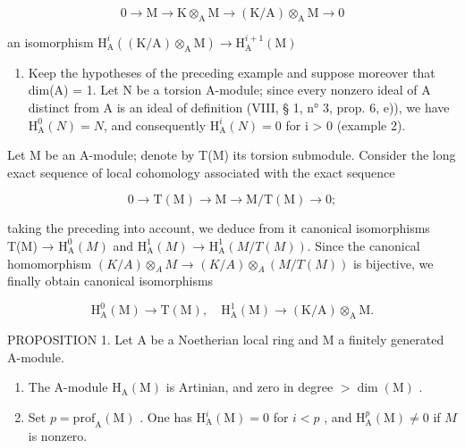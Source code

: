 \[
0 \rightarrow \mathrm{M} \rightarrow \mathrm{K} \otimes_ {\mathrm{A}} \mathrm{M} \rightarrow (\mathrm{K/A}) \otimes_ {\mathrm{A}} \mathrm{M} \rightarrow 0
\]

an isomorphism \(\mathrm{H}_{\mathrm{A}}^{i}((\mathrm{K}/\mathrm{A})\otimes_{\mathrm{A}}\mathrm{M})\to \mathrm{H}_{\mathrm{A}}^{i + 1}(\mathrm{M})\)

\begin{enumerate}
\def\labelenumi{\arabic{enumi})}
\setcounter{enumi}{4}
\tightlist
\item
  Keep the hypotheses of the preceding example and suppose moreover that dim(A) = 1. Let N be a torsion A-module; since every nonzero ideal of A distinct from A is an ideal of definition (VIII, § 1, n° 3, prop. 6, e)), we have \(\mathrm{H}_{\mathrm{A}}^{0}(N) = N\), and consequently \(\mathrm{H}_{\mathrm{A}}^{i}(N) = 0\) for i > 0 (example 2).
\end{enumerate}

Let M be an A-module; denote by T(M) its torsion submodule. Consider the long exact sequence of local cohomology associated with the exact sequence

\[
0 \to \mathrm{T} (\mathrm{M}) \to \mathrm{M} \to \mathrm{M} / \mathrm{T} (\mathrm{M}) \to 0;
\]

taking the preceding into account, we deduce from it canonical isomorphisms T(M) → \(\mathrm{H}_{\mathrm{A}}^{0}(M)\) and \(\mathrm{H}_{\mathrm{A}}^{1}(M)\) → \(\mathrm{H}_{\mathrm{A}}^{1}(M/T(M))\). Since the canonical homomorphism \((K/A) \otimes_{A} M\) → \((K/A) \otimes_{A} (M/T(M))\) is bijective, we finally obtain canonical isomorphisms

\[
\mathrm{H} _ {\mathrm{A}} ^ {0} (\mathrm{M}) \rightarrow \mathrm{T} (\mathrm{M}), \quad \mathrm{H} _ {\mathrm{A}} ^ {1} (\mathrm{M}) \rightarrow (\mathrm{K} / \mathrm{A}) \otimes_ {\mathrm{A}} \mathrm{M}.
\]

PROPOSITION 1. Let A be a Noetherian local ring and M a finitely generated A-module.

\begin{enumerate}
\def\labelenumi{\alph{enumi})}
\item
  The A-module \(\mathrm{H}_{\mathrm{A}}(\mathrm{M})\) is Artinian, and zero in degree \(>\dim (\mathrm{M})\) .
\item
  Set \(p = \mathrm{prof}_{\mathrm{A}}(\mathrm{M})\) . One has \(\mathrm{H}_{\mathrm{A}}^{i}(\mathrm{M}) = 0\) for \(i < p\) , and \(\mathrm{H}_{\mathrm{A}}^{p}(\mathrm{M}) \neq 0\) if \(M\) is nonzero.
\end{enumerate}

